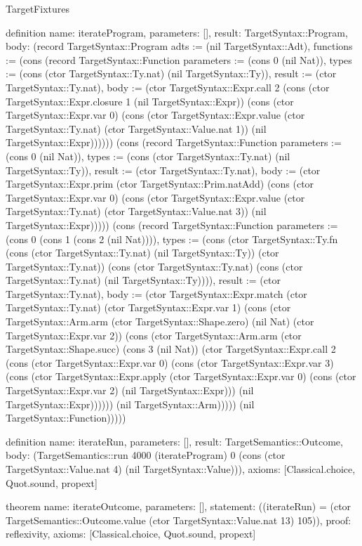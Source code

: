 \begin{lexlean}{TargetFixtures}
\begin{semanticmodule}
definition{
  name: iterateProgram,
  parameters: [],
  result: TargetSyntax::Program,
  body: (record TargetSyntax::Program {adts := (nil TargetSyntax::Adt), functions := (cons (record TargetSyntax::Function {parameters := (cons 0 (nil Nat)), types := (cons (ctor TargetSyntax::Ty.nat) (nil TargetSyntax::Ty)), result := (ctor TargetSyntax::Ty.nat), body := (ctor TargetSyntax::Expr.call 2 (cons (ctor TargetSyntax::Expr.closure 1 (nil TargetSyntax::Expr)) (cons (ctor TargetSyntax::Expr.var 0) (cons (ctor TargetSyntax::Expr.value (ctor TargetSyntax::Ty.nat) (ctor TargetSyntax::Value.nat 1)) (nil TargetSyntax::Expr)))))}) (cons (record TargetSyntax::Function {parameters := (cons 0 (nil Nat)), types := (cons (ctor TargetSyntax::Ty.nat) (nil TargetSyntax::Ty)), result := (ctor TargetSyntax::Ty.nat), body := (ctor TargetSyntax::Expr.prim (ctor TargetSyntax::Prim.natAdd) (cons (ctor TargetSyntax::Expr.var 0) (cons (ctor TargetSyntax::Expr.value (ctor TargetSyntax::Ty.nat) (ctor TargetSyntax::Value.nat 3)) (nil TargetSyntax::Expr))))}) (cons (record TargetSyntax::Function {parameters := (cons 0 (cons 1 (cons 2 (nil Nat)))), types := (cons (ctor TargetSyntax::Ty.fn (cons (ctor TargetSyntax::Ty.nat) (nil TargetSyntax::Ty)) (ctor TargetSyntax::Ty.nat)) (cons (ctor TargetSyntax::Ty.nat) (cons (ctor TargetSyntax::Ty.nat) (nil TargetSyntax::Ty)))), result := (ctor TargetSyntax::Ty.nat), body := (ctor TargetSyntax::Expr.match (ctor TargetSyntax::Ty.nat) (ctor TargetSyntax::Expr.var 1) (cons (ctor TargetSyntax::Arm.arm (ctor TargetSyntax::Shape.zero) (nil Nat) (ctor TargetSyntax::Expr.var 2)) (cons (ctor TargetSyntax::Arm.arm (ctor TargetSyntax::Shape.succ) (cons 3 (nil Nat)) (ctor TargetSyntax::Expr.call 2 (cons (ctor TargetSyntax::Expr.var 0) (cons (ctor TargetSyntax::Expr.var 3) (cons (ctor TargetSyntax::Expr.apply (ctor TargetSyntax::Expr.var 0) (cons (ctor TargetSyntax::Expr.var 2) (nil TargetSyntax::Expr))) (nil TargetSyntax::Expr)))))) (nil TargetSyntax::Arm))))}) (nil TargetSyntax::Function))))})
}

definition{
  name: iterateRun,
  parameters: [],
  result: TargetSemantics::Outcome,
  body: (TargetSemantics::run 4000 (iterateProgram) 0 (cons (ctor TargetSyntax::Value.nat 4) (nil TargetSyntax::Value))),
  axioms: [Classical.choice, Quot.sound, propext]
}

theorem{
  name: iterateOutcome,
  parameters: [],
  statement: ((iterateRun) = (ctor TargetSemantics::Outcome.value (ctor TargetSyntax::Value.nat 13) 105)),
  proof: reflexivity{},
  axioms: [Classical.choice, Quot.sound, propext]
}


\end{semanticmodule}
\end{lexlean}

